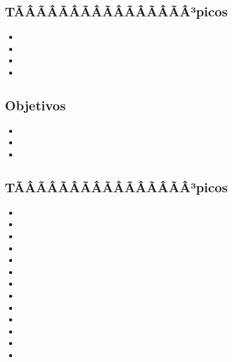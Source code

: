 \subsection*{TÃÂÃÂÃÂÃÂÃÂÃÂÃÂÃÂ³picos}
\begin{itemize}
	\item \ALSEISTopicDefinicion
	\item \ALSEISTopicNP
	\item \ALSEISTopicProblemas
	\item \ALSEISTopicTecnicas
\end{itemize}

\subsection*{Objetivos}
\begin{itemize}
	\item \ALSEISObjUNO
	\item \ALSEISObjDOS
	\item \ALSEISObjTRES
\end{itemize}

\subsection{\ALSIETEDef}\label{sec:BOK-AL7}

\subsection*{TÃÂÃÂÃÂÃÂÃÂÃÂÃÂÃÂ³picos}
\begin{itemize}
	\item \ALSIETETopicAutomatas
	\item \ALSIETETopicAutomatasfinitos
	\item \ALSIETETopicEquivalencias
	\item \ALSIETETopicExpresiones
	\item \ALSIETETopicEl
	\item \ALSIETETopicAutomatasde
	\item \ALSIETETopicRelacion
	\item \ALSIETETopicPropiedades
	\item \ALSIETETopicMaquinas
	\item \ALSIETETopicMaquinasde
	\item \ALSIETETopicConjuntos
	\item \ALSIETETopicLa
	\item \ALSIETETopicLatesis
\end{itemize}

